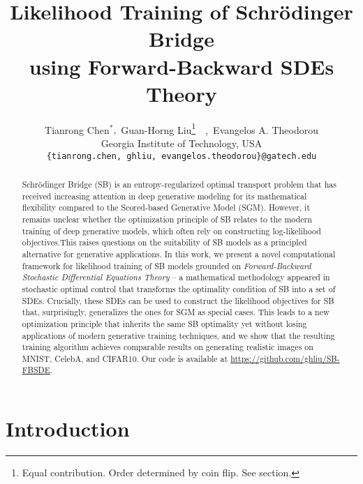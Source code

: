 \documentclass{article}
\title{Likelihood Training of Schr{\"o}dinger Bridge \\ using Forward-Backward SDEs Theory}
\author{Tianrong Chen$^{*}\text{,}$~Guan-Horng Liu\thanks{
    Equal contribution. Order determined by coin flip. See \nameref{sec:author} section.}~~,~Evangelos A. Theodorou\\
  Georgia Institute of Technology, USA\\
  \texttt{\{tianrong.chen, ghliu, evangelos.theodorou\}@gatech.edu}\\
}
\begin{document}
\maketitle

\begin{abstract} 


  Schr{\"o}dinger Bridge (SB) is an {entropy-regularized} optimal transport problem that
  has received increasing attention in deep generative modeling
  for its mathematical flexibility
  compared to the Scored-based Generative Model (SGM).
  However, it remains unclear
  whether the optimization principle of SB relates to the modern training of deep generative models,
  which often rely on constructing log-likelihood objectives.{This raises questions on the suitability of SB models as a principled alternative for generative applications.}
  In this work, we present a novel computational framework
  for likelihood training of SB models
  grounded on \textit{Forward-Backward Stochastic Differential Equations Theory}
  -- {a mathematical methodology appeared in stochastic optimal control}
  that transforms the optimality condition of SB into a set of SDEs.
  Crucially, these SDEs can be used to
  construct the likelihood objectives for SB that, surprisingly,
  generalizes the ones for SGM as special cases.
  This leads to a new optimization principle that
    inherits the same SB optimality
    yet without losing applications of modern generative training techniques,
  and we show that the resulting training algorithm
  achieves {comparable}
  results on generating realistic images on MNIST, CelebA, and CIFAR10.
  Our code is available at \url{https://github.com/ghliu/SB-FBSDE}.


\end{abstract}

\vspace{-5pt}
\section{Introduction} \label{sec:1}




\vspace{-1pt}
\end{document}
